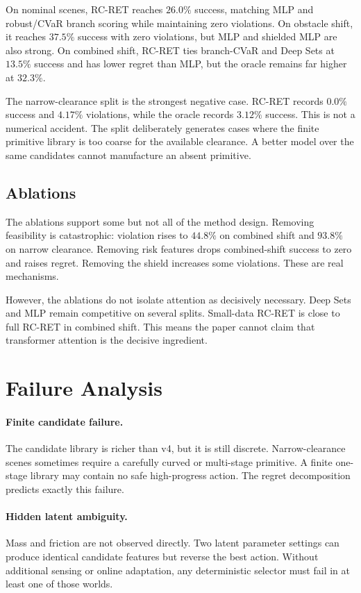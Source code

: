 \documentclass{article}
\newcommand{\method}{RC-RET}
\begin{document}
On nominal scenes, \method{} reaches $26.0\%$ success, matching MLP and robust/CVaR branch scoring while maintaining zero violations.  On obstacle shift, it reaches $37.5\%$ success with zero violations, but MLP and shielded MLP are also strong.  On combined shift, \method{} ties branch-CVaR and Deep Sets at $13.5\%$ success and has lower regret than MLP, but the oracle remains far higher at $32.3\%$.

The narrow-clearance split is the strongest negative case.  \method{} records $0.0\%$ success and $4.17\%$ violations, while the oracle records $3.12\%$ success.  This is not a numerical accident.  The split deliberately generates cases where the finite primitive library is too coarse for the available clearance.  A better model over the same candidates cannot manufacture an absent primitive.

\subsection{Ablations}

The ablations support some but not all of the method design.  Removing feasibility is catastrophic: violation rises to $44.8\%$ on combined shift and $93.8\%$ on narrow clearance.  Removing risk features drops combined-shift success to zero and raises regret.  Removing the shield increases some violations.  These are real mechanisms.

However, the ablations do not isolate attention as decisively necessary.  Deep Sets and MLP remain competitive on several splits.  Small-data \method{} is close to full \method{} in combined shift.  This means the paper cannot claim that transformer attention is the decisive ingredient.

\section{Failure Analysis}

\paragraph{Finite candidate failure.}
The candidate library is richer than v4, but it is still discrete.  Narrow-clearance scenes sometimes require a carefully curved or multi-stage primitive.  A finite one-stage library may contain no safe high-progress action.  The regret decomposition predicts exactly this failure.

\paragraph{Hidden latent ambiguity.}
Mass and friction are not observed directly.  Two latent parameter settings can produce identical candidate features but reverse the best action.  Without additional sensing or online adaptation, any deterministic selector must fail in at least one of those worlds.
\end{document}
